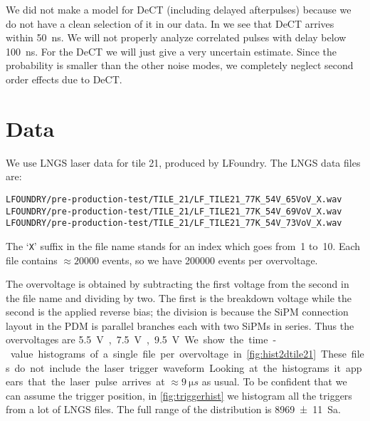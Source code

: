 We did not make a model for DeCT (including delayed afterpulses) because we do
not have a clean selection of it in our data. In
\cite[fig.~3.8~p.~54]{savarese2018} we see that DeCT arrives within
\SI{50}{ns}. We will not properly analyze correlated pulses with delay below
\SI{100}{ns}. For the DeCT we will just give a very uncertain estimate. Since
the probability is smaller than the other noise modes, we completely neglect
second order effects due to DeCT.

\section{Data}

We use LNGS laser data for tile 21, produced by LFoundry. The LNGS data files
are:
%
\begin{verbatim}
LFOUNDRY/pre-production-test/TILE_21/LF_TILE21_77K_54V_65VoV_X.wav
LFOUNDRY/pre-production-test/TILE_21/LF_TILE21_77K_54V_69VoV_X.wav
LFOUNDRY/pre-production-test/TILE_21/LF_TILE21_77K_54V_73VoV_X.wav
\end{verbatim}
%
The `\texttt{X}' suffix in the file name stands for an index which goes from~1
to~10. Each file contains $\approx\num{20000}$ events, so we have \num{200000}
events per overvoltage.

The overvoltage is obtained by subtracting the first voltage from the second in
the file name and dividing by two. The first is the breakdown voltage while the
second is the applied reverse bias; the division is because the SiPM connection
layout in the PDM is parallel branches each with two SiPMs in series. Thus the
overvoltages are \SI{5.5}V, \SI{7.5}V, \SI{9.5}V.

We show the time-value histograms of a single file per overvoltage in
\autoref{fig:hist2dtile21}. These files do not include the laser trigger
waveform. Looking at the histograms it appears that the laser pulse arrives at
$\approx\SI{9}{\micro s}$ as usual. To be confident that we can assume the
trigger position, in \autoref{fig:triggerhist} we histogram all the triggers
from a lot of LNGS files. The full range of the distribution is
\SI[separate-uncertainty=true]{8969 \pm 11}{Sa}.

\begin{figure}
    
    
    
\end{figure}

